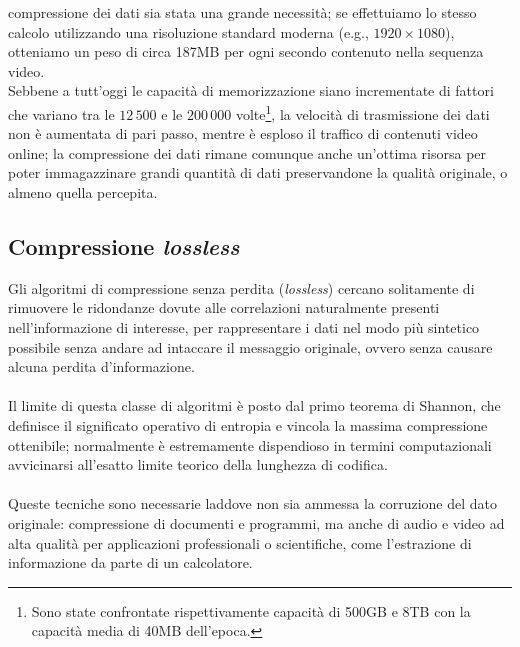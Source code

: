 compressione dei dati sia stata una grande necessità; se effettuiamo lo stesso 
calcolo utilizzando una risoluzione standard moderna (e.g., 
$1920{\times}1080$), 
otteniamo un peso di circa 187MB per ogni secondo contenuto nella sequenza 
video. \\
Sebbene a tutt'oggi le capacità di memorizzazione siano incrementate di fattori
che variano tra le $12\,500$ e le $200\,000$ volte\footnote{Sono state 
confrontate rispettivamente capacità di 500GB e 8TB con la capacità media di 
40MB dell'epoca.}, la velocità di trasmissione dei dati non è aumentata di pari 
passo, mentre è esploso il traffico di contenuti video online; la compressione 
dei dati rimane comunque anche un'ottima risorsa per
poter immagazzinare grandi quantità di dati preservandone la qualità originale, 
o almeno quella percepita.
\subsection{Compressione \emph{lossless}}

Gli algoritmi di compressione senza perdita (\emph{lossless}) cercano 
solitamente di rimuovere le ridondanze dovute alle correlazioni naturalmente 
presenti nell'informazione di interesse, per rappresentare i
dati nel modo più sintetico possibile senza andare ad intaccare il messaggio
originale, ovvero senza causare alcuna perdita d'informazione.
\\ \\ %
Il limite di questa classe di algoritmi è posto dal primo teorema di 
Shannon, che definisce il significato operativo di entropia e vincola la 
massima compressione ottenibile; normalmente è estremamente 
dispendioso in termini computazionali avvicinarsi all'esatto limite teorico 
della lunghezza di codifica. %
\\ \\
Queste tecniche sono necessarie laddove non sia ammessa la corruzione del dato 
originale: compressione di documenti e programmi, ma anche di audio e video ad 
alta qualità per applicazioni professionali o scientifiche, come l'estrazione 
di informazione da parte di un calcolatore.


